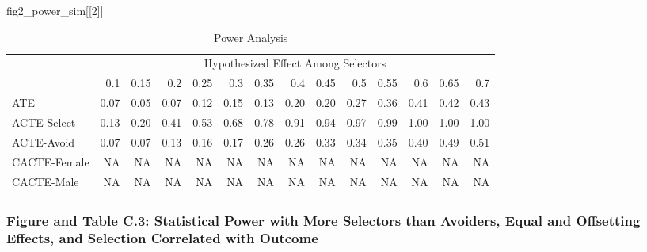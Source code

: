 \documentclass[
]{article}
\newenvironment{Shaded}{\begin{snugshade}}{\end{snugshade}}
\newcommand{\DecValTok}[1]{\textcolor[rgb]{0.00,0.00,0.81}{#1}}
\newcommand{\NormalTok}[1]{#1}
\begin{document}
\begin{Shaded}
\begin{Highlighting}[]
\NormalTok{fig2\_power\_sim[[}\DecValTok{2}\NormalTok{]]}
\end{Highlighting}
\end{Shaded}

\begin{table}[!h]

\caption{\label{tab:fig2}Power Analysis}
\centering
\begin{tabular}[t]{lrrrrrrrrrrrrr}
\toprule
\multicolumn{1}{c}{} & \multicolumn{13}{c}{Hypothesized Effect Among Selectors} \\
\cmidrule(l{3pt}r{3pt}){2-14}
  & 0.1 & 0.15 & 0.2 & 0.25 & 0.3 & 0.35 & 0.4 & 0.45 & 0.5 & 0.55 & 0.6 & 0.65 & 0.7\\
\midrule
ATE & 0.07 & 0.05 & 0.07 & 0.12 & 0.15 & 0.13 & 0.20 & 0.20 & 0.27 & 0.36 & 0.41 & 0.42 & 0.43\\
ACTE-Select & 0.13 & 0.20 & 0.41 & 0.53 & 0.68 & 0.78 & 0.91 & 0.94 & 0.97 & 0.99 & 1.00 & 1.00 & 1.00\\
ACTE-Avoid & 0.07 & 0.07 & 0.13 & 0.16 & 0.17 & 0.26 & 0.26 & 0.33 & 0.34 & 0.35 & 0.40 & 0.49 & 0.51\\
CACTE-Female & NA & NA & NA & NA & NA & NA & NA & NA & NA & NA & NA & NA & NA\\
CACTE-Male & NA & NA & NA & NA & NA & NA & NA & NA & NA & NA & NA & NA & NA\\
\bottomrule
\end{tabular}
\end{table}

\hypertarget{figure-and-table-c.3-statistical-power-with-more-selectors-than-avoiders-equal-and-offsetting-effects-and-selection-correlated-with-outcome}{%
\subsubsection{Figure and Table C.3: Statistical Power with More
Selectors than Avoiders, Equal and Offsetting Effects, and Selection
Correlated with
Outcome}\label{figure-and-table-c.3-statistical-power-with-more-selectors-than-avoiders-equal-and-offsetting-effects-and-selection-correlated-with-outcome}}
\end{document}
